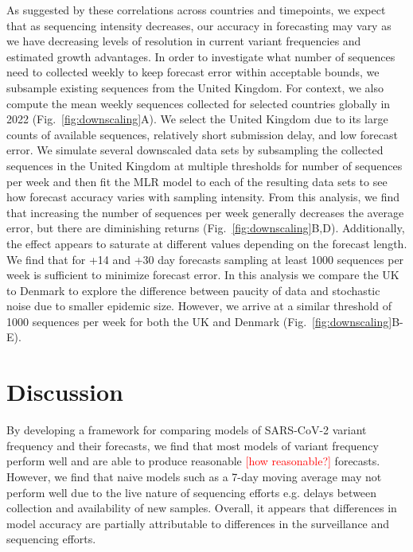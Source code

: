 \documentclass[11pt,oneside,letterpaper]{article}
\def\jhc#1{\textcolor{red}{[#1]}}
\begin{document}
As suggested by these correlations across countries and timepoints, we expect that as sequencing intensity decreases, our accuracy in forecasting may vary as we have decreasing levels of resolution in current variant frequencies and estimated growth advantages.
In order to investigate what number of sequences need to collected weekly to keep forecast error within acceptable bounds, we subsample existing sequences from the United Kingdom.
For context, we also compute the mean weekly sequences collected for selected countries globally in 2022 (Fig.~\ref{fig:downscaling}A).
We select the United Kingdom due to its large counts of available sequences, relatively short submission delay, and low forecast error.
We simulate several downscaled data sets by subsampling the collected sequences in the United Kingdom at multiple thresholds for number of sequences per week and then fit the MLR model to each of the resulting data sets to see how forecast accuracy varies with sampling intensity.
From this analysis, we find that increasing the number of sequences per week generally decreases the average error, but there are diminishing returns (Fig.~\ref{fig:downscaling}B,D).
Additionally, the effect appears to saturate at different values depending on the forecast length.
We find that for +14 and +30 day forecasts sampling at least 1000 sequences per week is sufficient to minimize forecast error.
In this analysis we compare the UK to Denmark to explore the difference between paucity of data and stochastic noise due to smaller epidemic size.
However, we arrive at a similar threshold of 1000 sequences per week for both the UK and Denmark  (Fig.~\ref{fig:downscaling}B-E).

\section*{Discussion}


By developing a framework for comparing models of SARS-CoV-2 variant frequency and their forecasts, we find that most models of variant frequency perform well and are able to produce reasonable \jhc{how reasonable?} forecasts.
However, we find that naive models such as a 7-day moving average may not perform well due to the live nature of sequencing efforts e.g. delays between collection and availability of new samples.
Overall, it appears that differences in model accuracy are partially attributable to differences in the surveillance and sequencing efforts.
\end{document}
